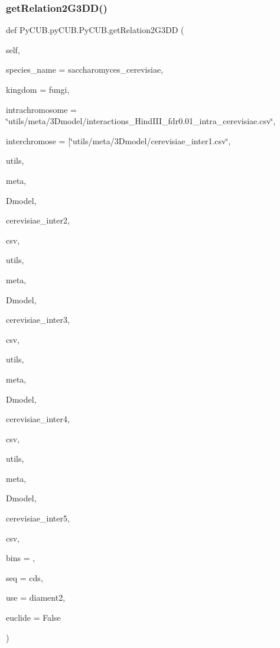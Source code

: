 \subsubsection{\texorpdfstring{get\+Relation2\+G3\+D\+D()}{getRelation2G3DD()}}
{\footnotesize\ttfamily def Py\+C\+U\+B.\+py\+C\+U\+B.\+Py\+C\+U\+B.\+get\+Relation2\+G3\+DD (\begin{DoxyParamCaption}\item[{}]{self,  }\item[{}]{species\+\_\+name = {\ttfamily \textquotesingle{}saccharomyces\+\_\+cerevisiae\textquotesingle{}},  }\item[{}]{kingdom = {\ttfamily \textquotesingle{}fungi\textquotesingle{}},  }\item[{}]{intrachromosome = {\ttfamily \char`\"{}utils/meta/3Dmodel/interactions\+\_\+HindIII\+\_\+fdr0.01\+\_\+intra\+\_\+cerevisiae.csv\char`\"{}},  }\item[{}]{interchromose = {\ttfamily \mbox{[}\char`\"{}utils/meta/3Dmodel/cerevisiae\+\_\+inter1.csv\char`\"{}},  }\item[{}]{utils,  }\item[{}]{meta,  }\item[{}]{Dmodel,  }\item[{}]{cerevisiae\+\_\+inter2,  }\item[{}]{csv,  }\item[{}]{utils,  }\item[{}]{meta,  }\item[{}]{Dmodel,  }\item[{}]{cerevisiae\+\_\+inter3,  }\item[{}]{csv,  }\item[{}]{utils,  }\item[{}]{meta,  }\item[{}]{Dmodel,  }\item[{}]{cerevisiae\+\_\+inter4,  }\item[{}]{csv,  }\item[{}]{utils,  }\item[{}]{meta,  }\item[{}]{Dmodel,  }\item[{}]{cerevisiae\+\_\+inter5,  }\item[{}]{csv,  }\item[{}]{bins = {},  }\item[{}]{seq = {\ttfamily \textquotesingle{}cds\textquotesingle{}},  }\item[{}]{use = {\ttfamily \textquotesingle{}diament2\textquotesingle{}},  }\item[{}]{euclide = {\ttfamily False} }\end{DoxyParamCaption})}



